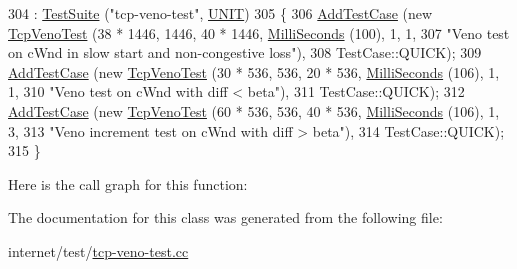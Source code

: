 \begin{DoxyCode}
304                       : \hyperlink{classns3_1_1TestSuite_a904b0c40583b744d30908aeb94636d1a}{TestSuite} (\textcolor{stringliteral}{"tcp-veno-test"}, \hyperlink{classns3_1_1TestSuite_a1ebfcab34ec8161e085e8e3a1855eae0a3885375a3787abf60431f8454b3cadbd}{UNIT})
305   \{
306     \hyperlink{classns3_1_1TestCase_a3718088e3eefd5d6454569d2e0ddd835}{AddTestCase} (\textcolor{keyword}{new} \hyperlink{classTcpVenoTest}{TcpVenoTest} (38 * 1446, 1446, 40 * 1446, 
      \hyperlink{group__timecivil_gaf26127cf4571146b83a92ee18679c7a9}{MilliSeconds} (100), 1, 1,
307                                   \textcolor{stringliteral}{"Veno test on cWnd in slow start and non-congestive loss"}),
308                  TestCase::QUICK);
309     \hyperlink{classns3_1_1TestCase_a3718088e3eefd5d6454569d2e0ddd835}{AddTestCase} (\textcolor{keyword}{new} \hyperlink{classTcpVenoTest}{TcpVenoTest} (30 * 536, 536, 20 * 536, 
      \hyperlink{group__timecivil_gaf26127cf4571146b83a92ee18679c7a9}{MilliSeconds} (106), 1, 1,
310                                   \textcolor{stringliteral}{"Veno test on cWnd with diff < beta"}),
311                  TestCase::QUICK);
312     \hyperlink{classns3_1_1TestCase_a3718088e3eefd5d6454569d2e0ddd835}{AddTestCase} (\textcolor{keyword}{new} \hyperlink{classTcpVenoTest}{TcpVenoTest} (60 * 536, 536, 40 * 536, 
      \hyperlink{group__timecivil_gaf26127cf4571146b83a92ee18679c7a9}{MilliSeconds} (106), 1, 3,
313                                   \textcolor{stringliteral}{"Veno increment test on cWnd with diff > beta"}),
314                  TestCase::QUICK);
315   \}
\end{DoxyCode}


Here is the call graph for this function\+:




The documentation for this class was generated from the following file\+:\begin{DoxyCompactItemize}
\item 
internet/test/\hyperlink{tcp-veno-test_8cc}{tcp-\/veno-\/test.\+cc}\end{DoxyCompactItemize}

